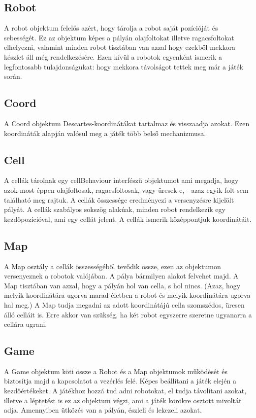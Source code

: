 
\subsection{Robot}

A robot objektum felelős azért, hogy tárolja a robot saját pozícióját és sebességét. Ez az objektum képes a pályán olajfoltokat illetve ragacsfoltokat elhelyezni, valamint minden robot tisztában van azzal hogy ezekből mekkora készlet áll még rendelkezésére. Ezen kívül a robotok egyenként ismerik a legfontosabb tulajdonságukat: hogy mekkora távolságot tettek meg már a játék során.

\subsection{Coord}

A Coord objektum Descartes-koordinátákat tartalmaz és visszaadja azokat. Ezen koordináták alapján valósul meg a játék több belső mechanizmusa.

\subsection{Cell}

A cellák tárolnak egy cellBehaviour interfészű objektumot ami megadja, hogy azok most éppen olajfoltosak, ragacsfoltosak, vagy üresek-e, - azaz egyik folt sem található meg rajtuk. A cellák összessége eredményezi a versenyzésre kijelölt pályát. A cellák szabályos sokszög alakúak, minden robot rendelkezik egy kezdőpozícióval, ami egy cellát jelent. A cellák ismerik középpontjuk koordinátáit.

\subsection{Map}

A Map osztály a cellák összességéből tevődik össze, ezen az objektumon versenyeznek a robotok valójában. A pálya bármilyen alakot felvehet majd. A Map tisztában van azzal, hogy a pályán hol van cella, s hol nincs. (Azaz, hogy melyik koordinátára ugorva marad életben a robot és melyik koordinátára ugorva hal meg.) A Map tudja megadni az adott koordinátájú cella szomszédos, üresen álló celláit is. Erre akkor van szükség, ha két robot egyszerre szeretne ugyanarra a cellára ugrani.

\subsection{Game}

A Game objektum köti össze a Robot és a Map objektumok működését és biztosítja majd a kapcsolatot a vezérlés felé. Képes beállítani a játék elején a kezdőértékeket. A játékhoz hozzá tud adni robotokat, el tudja távolítani azokat, illetve a léptetést is ez az objektum végzi, ami a játék körökre osztott mivoltát adja. Amennyiben ütközés van a pályán, észleli és lekezeli azokat. 